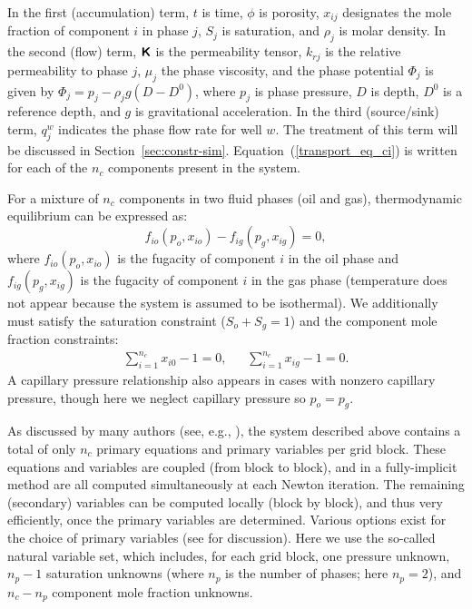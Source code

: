 \documentclass[twocolumn,numbook]{svjour3}          %
\begin{document}
In the first (accumulation) term, $t$ is time, $\phi$ is porosity, $x_{ij}$
designates the mole fraction of component $i$ in phase $j$, $S_j$ is saturation,
and $\rho_j$ is molar density. In the second (flow) term,  $\boldsymbol{\mathsf{K}}$ 
is the permeability tensor, $k_{rj}$ is the relative permeability to
phase $j$, $\mu_j$ the phase viscosity, and the phase potential
$\Phi_j$ is given by $\Phi_j = p_j-\rho_j g(D-D^0)$, where $p_j$ is
phase pressure, $D$ is depth, $D^0$ is a reference depth, and $g$ is
gravitational acceleration. In the third (source/sink) term, $q_j^w$
indicates the phase flow rate for well $w$. The treatment of this term will be discussed in Section~\ref{sec:constr-sim}. Equation~(\ref{transport_eq_ci}) is written for each of the $n_c$
components present in the system.

For a mixture of $n_c$ components in two fluid phases (oil and gas), thermodynamic equilibrium
can be expressed as:
%
\begin{equation} \label{general_therm_system1} f_{io}(p_o, x_{io}) - f_{ig}(p_g,
  x_{ig}) = 0,  \end{equation}
%
where $f_{io}(p_o, x_{io})$ is the fugacity of component $i$ in the oil phase and $f_{ig}(p_g, x_{ig})$ 
is the fugacity of component $i$ in the gas phase (temperature does not appear because the system is assumed to
be isothermal).
We additionally must satisfy the saturation constraint ($S_o+S_g=1$) and the
component mole fraction constraints:
%
\begin{align}\label{eqn:MoleFractionCons} \sum_{i=1}^{n_c} x_{i0} -1 = 0, \ \ \
    \ \ \ \ \sum_{i=1}^{n_c} x_{ig} -1 = 0.  \end{align}
%
A capillary pressure relationship also appears in cases with nonzero capillary
pressure, though here we neglect capillary pressure so $p_o=p_g$.

As discussed by many authors (see, e.g.,
\cite{Coats:1980,Cao:Thesis,Voskov:2012,Young:1983}), the system described
above contains a total of only $n_c$ primary equations and primary variables per
grid block. These equations and variables are coupled (from block to block), and
in a fully-implicit method are all computed simultaneously at each Newton
iteration. The remaining (secondary) variables can be computed locally (block by
block), and thus very efficiently, once the primary variables are determined.
Various options exist for the choice of primary variables (see
\cite{Voskov:2012} for discussion). Here we use the so-called natural variable
set, which includes, for each grid block, one pressure unknown, $n_p-1$
saturation unknowns (where $n_p$ is the number of phases; here $n_p=2$), and $n_c-n_p$ component mole fraction unknowns.
\end{document}
